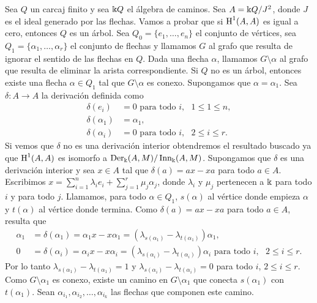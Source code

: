 \documentclass[a4paper,oneside,fleqn,11pt,../tesis.tex]{subfiles}
\begin{document}
\begin{example}
	Sea $Q$ un carcaj finito y sea $\Bbbk Q$ el álgebra de caminos.
	Sea $A = \Bbbk Q / J^2$, donde $J$ es el ideal generado por las flechas.
	Vamos a probar que si $\operatorname{H}^1(A, A)$ es igual	a cero, entonces $Q$ es un árbol. Sea $Q_0 = \lbrace e_1, \ldots, e_n\rbrace$
	el conjunto de vértices, sea $Q_1 = \lbrace \alpha_1, \ldots, \alpha_r \rbrace$ el conjunto de flechas
	y llamamos $G$ al grafo que resulta de ignorar el sentido de las flechas en $Q$. Dada una flecha $\alpha$, llamamos
	$G \setminus \alpha$ al grafo que resulta de eliminar la arista correspondiente.
	Si $Q$ no es un árbol, entonces existe una flecha $\alpha \in Q_1$ tal que $G \setminus \alpha$ es conexo.
	Supongamos que $\alpha = \alpha_1$. Sea $\delta : A\to A$ la derivación definida como
	\begin{align*}
		\delta(e_i) &= 0 \text{ para todo } i,\text{ }1\leq 1 \leq n,\\
		\delta(\alpha_1) &= \alpha_1,\\
		\delta(\alpha_i) &= 0 \text{ para todo } i,\text{ } 2 \leq i \leq r.
	\end{align*}
	Si vemos que $\delta$ no es una derivación interior obtendremos el resultado buscado
	ya que $\operatorname{H}^1(A, A)$ es isomorfo a $\operatorname{Der}_{\Bbbk}(A, M) / \operatorname{Inn}_{\Bbbk}(A, M)$.  Supongamos que
	$\delta$ es una derivación interior y sea $x \in A$
	tal que $\delta(a) = ax - xa$ para todo $a \in A$. Escribimos $x = \sum_{i = 1}^{n}\lambda_i e_i + \sum_{j = 1}^r\mu_j \alpha_j$,
	donde $\lambda_i$ y $\mu_j$ pertenecen a $\Bbbk$ para todo $i$ y para todo $j$. Llamamos, para todo $\alpha \in Q_1$,
	$s(\alpha)$ al vértice donde empieza $\alpha$ y $t(\alpha)$ al vértice donde termina. Como $\delta(a) = ax - xa$ para todo $a \in A$, resulta que
	\begin{align*}
		\alpha_1 &= \delta(\alpha_1) = \alpha_1 x - x\alpha_1 = \left(\lambda_{s(\alpha_1)} - \lambda_{t(\alpha_1)}\right)\alpha_1,\\
		0 &= \delta(\alpha_i) = \alpha_i x - x\alpha_i
			= \left(\lambda_{s(\alpha_i)} - \lambda_{t(\alpha_i)}\right)\alpha_i \text{ para todo } i, \text{ }2\leq i \leq r.
	\end{align*}
	Por lo tanto $\lambda_{s(\alpha_1)} - \lambda_{t(\alpha_1)} = 1$ y $\lambda_{s(\alpha_i)}
			- \lambda_{t(\alpha_i)} = 0$ para todo $i$, $2\leq i \leq r$. 
	Como $G \setminus \alpha_1$ es conexo, existe un camino en $G \setminus \alpha_1$ que conecta $s(\alpha_1)$ con $t(\alpha_1)$.
	Sean $\alpha_{i_1}, \alpha_{i_2}, \ldots, \alpha_{i_k}$ las flechas que componen este camino.

\end{example}
\end{document}

